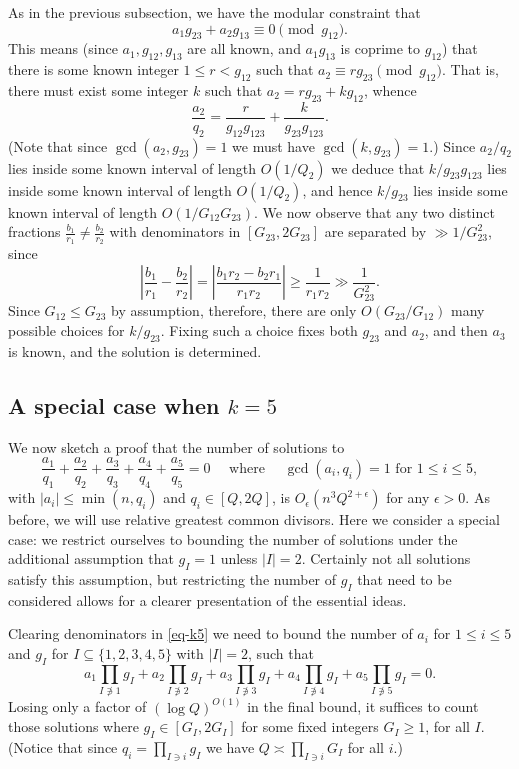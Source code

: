 \documentclass[11pt,letterpaper]{amsart}
\newcommand{\abs}[1]{\left\lvert #1\right\rvert}
\newcommand{\ogcd}[2]{\gcd(#1,#2)}
\theoremstyle{definition}
\begin{document}
As in the previous subsection, we have the modular constraint that
\[a_1g_{23}+a_2g_{13}\equiv 0\pmod{g_{12}}.\]
This means (since $a_1,g_{12},g_{13}$ are all known, and $a_1g_{13}$ is coprime to $g_{12}$) that there is some known integer $1\leq r<g_{12}$ such that $a_2\equiv rg_{23}\pmod{g_{12}}$. That is, there must exist some integer $k$ such that $a_2=rg_{23}+kg_{12}$, whence
\[\frac{a_2}{q_2}=\frac{r}{g_{12}g_{123}}+\frac{k}{g_{23}g_{123}}.\]
(Note that since $\ogcd{a_2}{g_{23}}=1$ we must have $\ogcd{k}{g_{23}}=1$.) Since $a_2/q_2$ lies inside some known interval of length $O(1/Q_2)$ we deduce that $k/g_{23}g_{123}$ lies inside some known interval of length $O(1/Q_2)$, and hence $k/g_{23}$ lies inside some known interval of length $O(1/G_{12}G_{23})$. We now observe that any two distinct fractions $\frac{b_1}{r_1}\neq \frac{b_2}{r_2}$ with denominators in $[G_{23},2G_{23}]$ are separated by $\gg 1/G_{23}^2$, since
\[\abs{\frac{b_1}{r_1}-\frac{b_2}{r_2}}=\abs{\frac{b_1r_2-b_2r_1}{r_1r_2}}\geq \frac{1}{r_1r_2}\gg \frac{1}{G_{23}^2}.\]
Since $G_{12}\leq G_{23}$ by assumption, therefore, there are only $O(G_{23}/G_{12})$ many possible choices for $k/g_{23}$. Fixing such a choice fixes both $g_{23}$ and $a_2$, and then $a_3$ is known, and the solution is determined.

\subsection{A special case when $k=5$}
We now sketch a proof that the number of solutions to 
\begin{equation}\label{eq-k5}
\frac{a_1}{q_1}+\frac{a_2}{q_2}+\frac{a_3}{q_3}+\frac{a_4}{q_4}+\frac{a_5}{q_5}=0\quad\textrm{ where }\quad \ogcd{a_i}{q_i}=1\textrm{ for }1\leq i\leq 5, 
\end{equation}
with $\abs{a_i}\leq \min(n,q_i)$ and $q_i\in [Q,2Q]$, is $O_\epsilon(n^3Q^{2+\epsilon})$ for any $\epsilon>0$. As before, we will use relative greatest common divisors. Here we consider a special case: we restrict ourselves to bounding the number of solutions under the additional assumption that $g_I=1$ unless $\abs{I}=2$. Certainly not all solutions satisfy this assumption, but restricting the number of $g_I$ that need to be considered allows for a clearer presentation of the essential ideas.

Clearing denominators in \eqref{eq-k5} we need to bound the number of $a_i$ for $1\leq i\leq 5$ and $g_I$ for $I\subseteq \{1,2,3,4,5\}$ with $\abs{I}=2$, such that
\begin{equation}\label{eq-k5'}
a_1\prod_{I\not\ni 1}g_I+a_2\prod_{I\not\ni 2}g_I+a_3\prod_{I\not\ni 3}g_I+a_4\prod_{I\not\ni 4}g_I+a_5\prod_{I\not\ni 5}g_I=0.
\end{equation}
Losing only a factor of $(\log Q)^{O(1)}$ in the final bound, it suffices to count those solutions where $g_I\in [G_I,2G_I]$ for some fixed integers $G_I\geq 1$, for all $I$. (Notice that since $q_i=\prod_{I\ni i}g_I$ we have $Q\asymp \prod_{I\ni i}G_I$ for all $i$.)
\end{document}
